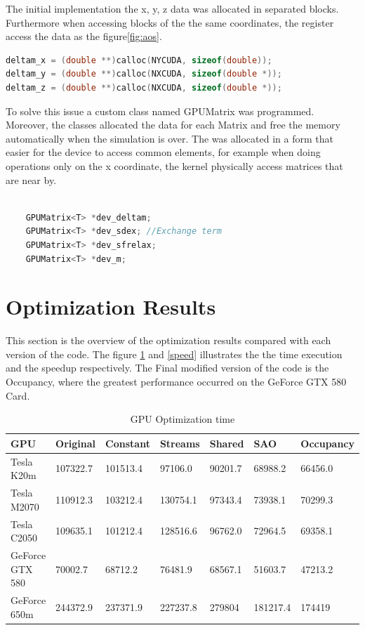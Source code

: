 The initial implementation the  x, y, z data was allocated in separated blocks. Furthermore when accessing blocks of the the same coordinates, the register access the data as the figure\ref{fig:aos}.

\begin{lstlisting}[language=C++, caption={AOS implementation}]
deltam_x = (double **)calloc(NYCUDA, sizeof(double));
deltam_y = (double **)calloc(NXCUDA, sizeof(double *));
deltam_z = (double **)calloc(NXCUDA, sizeof(double *));
\end{lstlisting}

To solve this issue a custom class named GPUMatrix was programmed. Moreover, the classes allocated the data for each Matrix and free the memory automatically when the simulation is over. The was allocated in a form that easier for the device to access common elements, for example when doing operations only on the x coordinate, the kernel physically access matrices that are near by.

\begin{lstlisting}[language=C++, caption={SOA implementation}]

    GPUMatrix<T> *dev_deltam;
    GPUMatrix<T> *dev_sdex; //Exchange term
    GPUMatrix<T> *dev_sfrelax;
    GPUMatrix<T> *dev_m; 
\end{lstlisting}


\section{Optimization Results}


This section is the overview of the optimization results compared with each version of the code. The figure \ref{tab:time} and \ref{speed} illustrates the the time execution and the speedup respectively. The Final modified version of the code is the Occupancy, where the greatest performance occurred on the GeForce GTX 580 Card.

\begin{table}[h]
\centering
  \begin{tabular} { |  l  |  l | l  |  l  | l | l | l |}
    \hline
    GPU & Original & Constant & Streams & Shared & SAO & Occupancy \\
    \hline
    Tesla K20m & 107322.7 & 101513.4 & 97106.0 & 90201.7 & 68988.2 & 66456.0\\
   \hline
    Tesla M2070 & 110912.3 & 103212.4 & 130754.1 & 97343.4 & 73938.1 & 70299.3\\
    \hline
    Tesla C2050 & 109635.1 & 101212.4 & 128516.6 & 96762.0 & 72964.5 & 69358.1\\
   \hline
    GeForce GTX 580 & 70002.7 & 68712.2 & 76481.9 & 68567.1 & 51603.7 & 47213.2\\
   \hline
    GeForce 650m & 244372.9 & 237371.9 & 227237.8 & 279804 & 181217.4 & 174419\\
   \hline
  \end{tabular}
    \caption{GPU Optimization time}
  \label{tab:time}
  \end{table}
  

